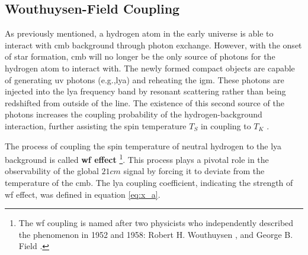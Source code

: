 \documentclass[12pt, TexShade, letterpaper]{report}
\begin{document}
\subsection{Wouthuysen-Field Coupling}
As previously mentioned, a hydrogen atom in the early universe is able to interact with \gls{cmb} background through photon exchange. However, with the onset of star formation, \gls{cmb} will no longer be the only source of photons for the hydrogen atom to interact with. The newly formed compact objects are capable of generating \gls{uv} photons (e.g.,\gls{lya}) and reheating the \gls{igm}. These photons are injected into the \gls{lya} frequency band by resonant scattering rather than being redshifted from outside of the line. The existence of this second source of the photons increases the coupling probability of the hydrogen-background interaction, further assisting the spin temperature $T_S$ in coupling to $T_K$ \cite{21century, low_frequency}.\par
The process of coupling the spin temperature of neutral hydrogen to the \gls{lya} background is called \textbf{\gls{wf} effect} \cite{barkana2001beginning}\footnote{The \gls{wf} coupling is named after two physicists who independently described the phenomenon in 1952 and 1958: Robert H. Wouthuysen \cite{wouthuysen_original}, and George B. Field \cite{field_original}.}. This process plays a pivotal role in the observability of the global $21cm$ signal by forcing it to deviate from the temperature of the \gls{cmb}. The \gls{lya} coupling coefficient, indicating the strength of \gls{wf} effect, was defined in equation \ref{eq:x_a}. \par
\end{document}
